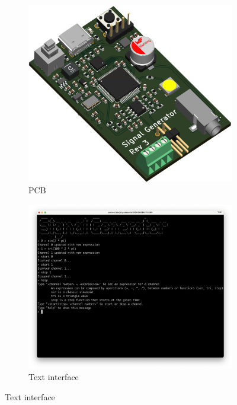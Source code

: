 \begin{figure}[h]
      \captionsetup[subfigure]{labelformat=empty}
      \centering
      \begin{subfigure}[b]{0.45\textwidth}
            \centering
            \includegraphics[width=\textwidth]{graphics/pcb_render.png}
            \caption{PCB}
      \end{subfigure}
      \hfill
      \begin{subfigure}[b]{0.50\textwidth}
            \centering
            \includegraphics[width=\textwidth]{graphics/console_example.png}
            \caption{Text interface}
      \end{subfigure}
\end{figure}

